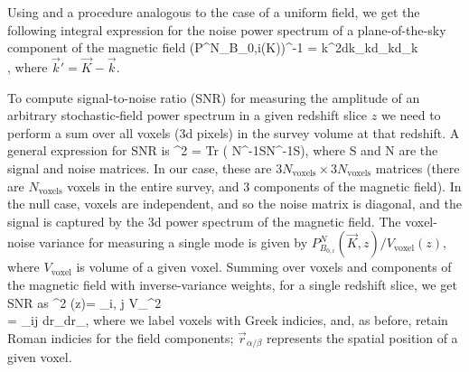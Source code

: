 Using \eq{\ref{eq:NK}} and a procedure analogous to the case of a uniform field, we get the following integral expression for the noise power spectrum of a plane-of-the-sky component of the magnetic field 
\beq
\bga
\left(P^N_{B_{0,i}}(\vec K)\right)^{-1} = \int k^2d{k}\sin \theta_kd\theta_kd\phi_k \\
\times{} ,
\ega
\label{eq:NK2}
\eeq
where $\vec k'=\vec K -\vec k$.

To compute signal-to-noise ratio (SNR) for measuring the amplitude of an arbitrary stochastic-field power spectrum in a given redshift slice $z$ we need to perform a sum over all voxels (3d pixels) in the survey volume at that redshift. A general expression for SNR is 
\beq
{}^2 =  Tr \left( N^{-1}SN^{-1}S\right),
\label{eq:snr_general}
\eeq
where S and N are the signal and noise matrices. In our case, these are $3N_\text{voxels}\times 3N_\text{voxels}$ matrices (there are $N_\text{voxels}$ voxels in the entire survey, and 3 components of the magnetic field). In the null case, voxels are independent, and so the noise matrix is diagonal, and the signal is captured by the 3d power spectrum of the magnetic field. The voxel-noise  variance for measuring a single mode is given by $P^N_{B_{0,i}}(\vec K, z)/V_\text{voxel} (z)$, where $V_\text{voxel}$ is volume of a given voxel. Summing over voxels and components of the magnetic field with inverse-variance weights, for a single redshift slice, we get SNR as
\beq
\bga
{}^2 (z)=  \sum_{i\alpha, j\beta}  V_^2\\=
 \sum_{ij} \int d\vec r_\alpha \int d\vec r_\beta {},
\ega
\label{eq:snr_z_step1}
\eeq
where we label voxels with Greek indicies, and, as before, retain Roman indicies for the field components; $\vec r_{\alpha/\beta}$ represents the spatial position of a given voxel. 

